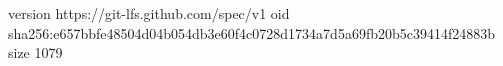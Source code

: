version https://git-lfs.github.com/spec/v1
oid sha256:e657bbfe48504d04b054db3e60f4c0728d1734a7d5a69fb20b5c39414f24883b
size 1079
